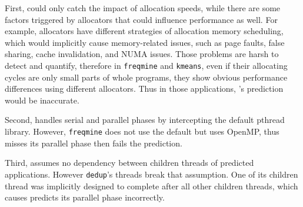 First, \MP{} could only catch the impact of allocation speeds, while there are some factors triggered by allocators that could influence performance as well. For example, allocators have different strategies of allocation memory scheduling, which would implicitly cause memory-related issues, such as page faults, false sharing, cache invalidation, and NUMA issues. Those problems are harsh to detect and quantify, therefore in \texttt{freqmine} and \texttt{kmeans}, even if their allocating cycles are only small parts of whole programs, they show obvious performance differences using different allocators. Thus in those applications, \MP{}'s prediction would be inaccurate.

Second, \MP{} handles serial and parallel phases by intercepting the default pthread library. However, \texttt{freqmine} does not use the default but uses OpenMP, thus \MP{} misses its parallel phase then fails the prediction.

Third, \MP assumes no dependency between children threads of predicted applications. However \texttt{dedup}'s threads break that assumption. One of its children thread was implicitly designed to complete after all other children threads, which causes \MP{} predicts its parallel phase incorrectly.
